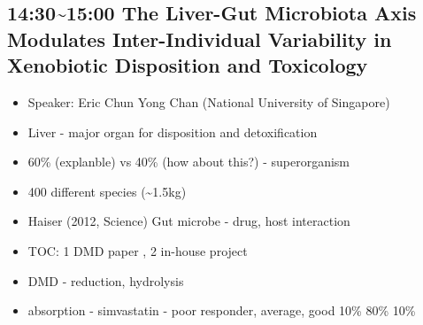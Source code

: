 \documentclass[]{book}
\providecommand{\tightlist}{%
  \setlength{\itemsep}{0pt}\setlength{\parskip}{0pt}}
\begin{document}
\subsection{14:30\textasciitilde{}15:00 The Liver-Gut Microbiota Axis
Modulates Inter-Individual Variability in Xenobiotic Disposition and
Toxicology}\label{the-liver-gut-microbiota-axis-modulates-inter-individual-variability-in-xenobiotic-disposition-and-toxicology}

\begin{itemize}
\tightlist
\item
  Speaker: Eric Chun Yong Chan (National University of Singapore)
\item
  Liver - major organ for disposition and detoxification
\item
  60\% (explanble) vs 40\% (how about this?) - superorganism
\item
  400 different species (\textasciitilde{}1.5kg)
\item
  Haiser (2012, Science) Gut microbe - drug, host interaction
\item
  TOC: 1 DMD paper , 2 in-house project
\item
  DMD - reduction, hydrolysis
\item
  absorption - simvastatin - poor responder, average, good 10\% 80\%
  10\%


\end{itemize}
\end{document}
